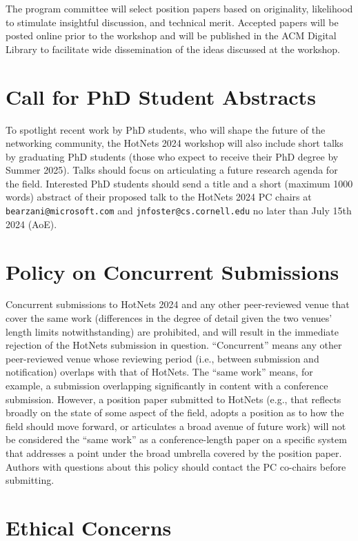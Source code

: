 \documentclass[sigconf,10pt,anonymous,review,nonacm]{acmart}
\begin{document}
The program committee will select position papers based on originality, likelihood to stimulate insightful discussion, and technical merit. Accepted papers will be posted online prior to the workshop and will be published in the ACM Digital Library to facilitate wide dissemination of the ideas discussed at the workshop.

\section{Call for PhD Student Abstracts}

To spotlight recent work by PhD students, who will shape the future of the networking community, the HotNets 2024 workshop will also include short talks by graduating PhD students (those who expect to receive their PhD degree by Summer 2025). Talks should focus on articulating a future research agenda for the field. Interested PhD students should send a title and a short (maximum 1000 words) abstract of their proposed talk to the HotNets 2024 PC chairs at \texttt{bearzani@microsoft.com} and \texttt{jnfoster@cs.cornell.edu} no later than July 15th 2024 (AoE).

\section{Policy on Concurrent Submissions}

Concurrent submissions to HotNets 2024 and any other peer-reviewed venue that cover the same work (differences in the degree of detail given the two venues’ length limits notwithstanding) are prohibited, and will result in the immediate rejection of the HotNets submission in question. “Concurrent” means any other peer-reviewed venue whose reviewing period (i.e., between submission and notification) overlaps with that of HotNets. The ``same work'' means, for example, a submission overlapping significantly in content with a conference submission. However, a position paper submitted to HotNets (e.g., that reflects broadly on the state of some aspect of the field, adopts a position as to how the field should move forward, or articulates a broad avenue of future work) will not be considered the ``same work'' as a conference-length paper on a specific system that addresses a point under the broad umbrella covered by the position paper. Authors with questions about this policy should contact the PC co-chairs before submitting.

\section{Ethical Concerns}
\end{document}
